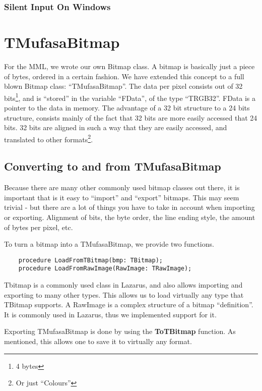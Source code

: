 \documentclass[a4paper]{report}
\begin{document}
\subsubsection{Silent Input On Windows}

\section{TMufasaBitmap}

For the MML, we wrote our own Bitmap class.
A bitmap is basically just a piece of bytes, ordered in a certain fashion.
We have extended this concept to a full blown Bitmap class: ``TMufasaBitmap''.
The data per pixel consists out of 32 bits\footnote{4 bytes}, and is 
``stored'' in the variable ``FData'', of the type ``TRGB32''.
FData is a pointer to the data in memory.
The advantage of a 32 bit structure to a 24 bits structure, consists mainly
of the fact that 32 bits are more easily accessed that 24 bits. 32 bits are
aligned in such a way that they are easily accessed, and translated to
other formats\footnote{Or just ``Colours''}.

\subsection{Converting to and from TMufasaBitmap}

Because there are many other commonly used bitmap classes out there, it is
important that is it easy to ``import'' and ``export'' bitmaps. This may seem
trivial - but there are a lot of things you have to take in account when
importing or exporting. Alignment of bits, the byte order, the line ending
style, the amount of bytes per pixel, etc.

To turn a bitmap into a TMufasaBitmap, we provide two functions.

\begin{verbatim}
    procedure LoadFromTBitmap(bmp: TBitmap);
    procedure LoadFromRawImage(RawImage: TRawImage);
\end{verbatim}

Tbitmap is a commonly used class in Lazarus, and also allows importing and
exporting to many other types. This allows us to load virtually any type that
TBitmap supports. A RawImage is a complex structure of a bitmap ``definition''.
It is commonly used in Lazarus, thus we implemented support for it.

Exporting TMufasaBitmap is done by using the \textbf{ToTBitmap} function. As
mentioned, this allows one to save it to virtually any format.
\end{document}
